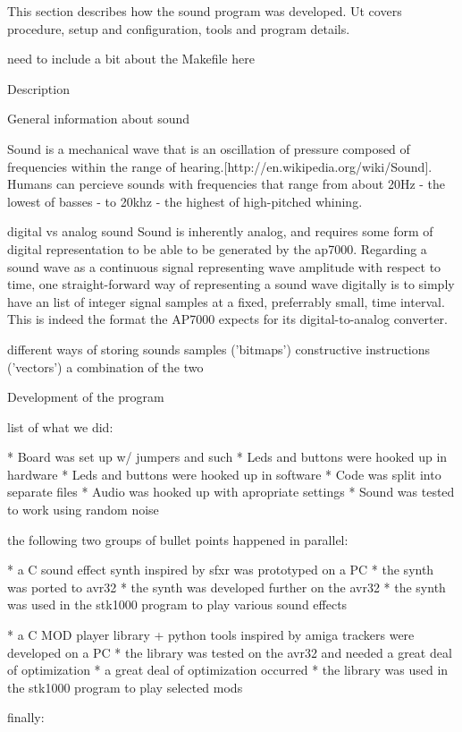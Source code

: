 
This section describes how the sound program was developed. Ut covers procedure, setup and configuration, tools and program details.



need to include a bit about the Makefile here


Description

General information about sound

Sound is a mechanical wave that is an oscillation of pressure composed of frequencies within the range of hearing.[http://en.wikipedia.org/wiki/Sound].
Humans can percieve sounds with frequencies that range from about 20Hz - the lowest of basses - to 20khz - the highest of high-pitched whining.

digital vs analog sound
Sound is inherently analog, and requires some form of digital representation to be able to be generated by the ap7000.
Regarding a sound wave as a continuous signal representing wave amplitude with respect to time, one straight-forward way of representing a sound wave digitally is to simply have an list of integer signal samples at a fixed, preferrably small, time interval.
This is indeed the format the AP7000 expects for its digital-to-analog converter.

different ways of storing sounds
samples ('bitmaps')
constructive instructions ('vectors')
a combination of the two


Development of the program

list of what we did:

* Board was set up w/ jumpers and such
* Leds and buttons were hooked up in hardware
* Leds and buttons were hooked up in software
* Code was split into separate files
* Audio was hooked up with apropriate settings
* Sound was tested to work using random noise


the following two groups of bullet points happened in parallel:

* a C sound effect synth inspired by sfxr was prototyped on a PC
* the synth was ported to avr32
* the synth was developed further on the avr32
* the synth was used in the stk1000 program to play various sound effects

* a C MOD player library + python tools inspired by amiga trackers were developed on a PC
* the library was tested on the avr32 and needed a great deal of optimization
* a great deal of optimization occurred 
* the library was used in the stk1000 program to play selected mods


finally:

